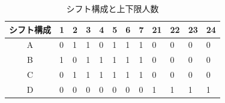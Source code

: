 \documentclass[11pt]{jsarticle}
\begin{document}
\begin{table}[htb]
  \begin{center}
    \caption{シフト構成と上下限人数}
    \begin{tabular}{clllllllllll}
      \hline \hline
      シフト構成 & 1 & 2 & 3 & 4 & 5 & 6 & 7 & 21 & 22 & 23 & 24 \\ \hline
        A & 0 & 1 & 1 & 0 & 1 & 1 & 1 & 0 & 0 & 0 & 0 \\
        B & 1 & 0 & 1 & 1 & 1 & 1 & 1 & 0 & 0 & 0 & 0 \\
        C & 0 & 1 & 1 & 1 & 1 & 1 & 1 & 0 & 0 & 0 & 0 \\
        D & 0 & 0 & 0 & 0 & 0 & 0 & 0 & 1 & 1 & 1 & 1 \\ \hline \hline
    \end{tabular}
    \label{tab:shift_construct}
  \end{center}
\end{table}
\end{document}
